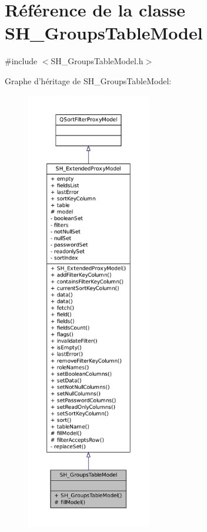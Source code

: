 \hypertarget{classSH__GroupsTableModel}{\section{Référence de la classe S\-H\-\_\-\-Groups\-Table\-Model}
\label{classSH__GroupsTableModel}
}


{\ttfamily \#include $<$S\-H\-\_\-\-Groups\-Table\-Model.\-h$>$}



Graphe d'héritage de S\-H\-\_\-\-Groups\-Table\-Model\-:
\nopagebreak
\begin{figure}[H]
\begin{center}
\leavevmode
\includegraphics[height=550pt]{classSH__GroupsTableModel__inherit__graph}
\end{center}
\end{figure}


